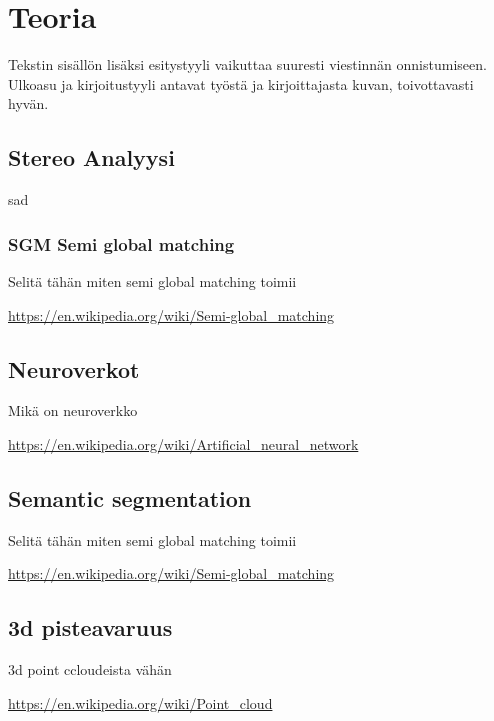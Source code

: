 \chapter{Teoria}%
\label{ch:teoria}

Tekstin sisällön lisäksi esitystyyli vaikuttaa suuresti viestinnän onnistumiseen. Ulkoasu ja kirjoitustyyli antavat työstä ja kirjoittajasta kuvan, toivottavasti hyvän.

\section{Stereo Analyysi}

sad

\subsection{SGM Semi global matching}

Selitä tähän miten semi global matching toimii

\url{https://en.wikipedia.org/wiki/Semi-global_matching}

\section{Neuroverkot}

Mikä on neuroverkko

\url{https://en.wikipedia.org/wiki/Artificial_neural_network}

\section{Semantic segmentation}

Selitä tähän miten semi global matching toimii

\url{https://en.wikipedia.org/wiki/Semi-global_matching}

\section{3d pisteavaruus}

3d point ccloudeista vähän

\url{https://en.wikipedia.org/wiki/Point_cloud}

